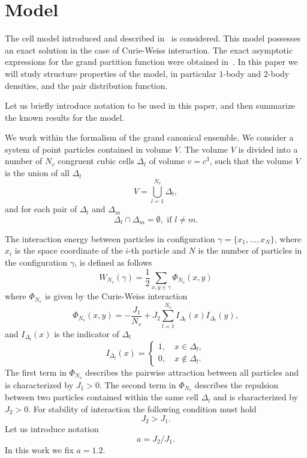 \section{\label{sec:model} Model}
The cell model introduced and described in~\cite{KozitskyKozlovskiiDobush2018book,KozitskyKozlovskiiDobush2020} is considered. This model possesses an exact solution in the case of Curie-Weiss interaction. The exact asymptotic expressions for the grand partition function were obtained in~\cite{KozitskyKozlovskiiDobush2020}. In this paper we will study structure properties of the model, in particular $1$-body and $2$-body densities, and the pair distribution function.

Let us briefly introduce notation to be used in this paper, and then summarize the known results for the model.

We work within the formalism of the grand canonical ensemble. We consider a system of point particles contained in volume $V$. The volume $V$ is divided into a number of $N_v$ congruent cubic cells $\Delta_l$ of volume $v=c^3$, such that the volume $V$ is the union of all $\Delta_l$
\begin{equation*}
	V = \bigcup_{l=1}^{N_v}\Delta_l,
\end{equation*}
and for each pair of $\Delta_l$ and $\Delta_m$
\begin{equation*}
	\Delta_l \cap \Delta_m = \emptyset, \text{ if } l \neq m.
\end{equation*}

The interaction energy between particles in configuration $\gamma = \{x_1, ..., x_N\}$, where $x_i$ is the space coordinate of the $i$-th particle and $N$ is the number of particles in the configuration $\gamma$, is defined as follows
\begin{equation*}
	W_{N_v}(\gamma) = \frac{1}{2} \sum_{x,y \in \gamma} \Phi_{N_v} (x,y)
\end{equation*}
where $\Phi_{N_v}$ is given by the Curie-Weiss interaction
\begin{equation}
	\label{def:curie-weiss-pot}
	\Phi_{N_v}(x, y) = -\frac{J_1}{N_v} + J_2\sum_{l=1}^{N_v} I_{\Delta_l}(x) I_{\Delta_l}(y),
\end{equation}
and $I_{\Delta_l}(x)$ is the indicator of $\Delta_l$
\begin{equation*}
	I_{\Delta_l} (x) = \left\{
	\begin{array}{ll}
		1, \quad x \in \Delta_l,
		\\
		0, \quad x \notin \Delta_l.
	\end{array}
	\right.
\end{equation*}
The first term in $\Phi_{N_v}$ describes the pairwise attraction between all particles and is characterized by $J_1 > 0$. The second term in $\Phi_{N_v}$ describes the repulsion between two particles contained within the same cell $\Delta_l$ and is characterized by $J_2 > 0.$ For stability of interaction the following condition must hold
\begin{equation*}
	J_2 > J_1.
\end{equation*}
Let us introduce notation
$$a = J_2/J_1.$$
In this work we fix $a=1.2$.

